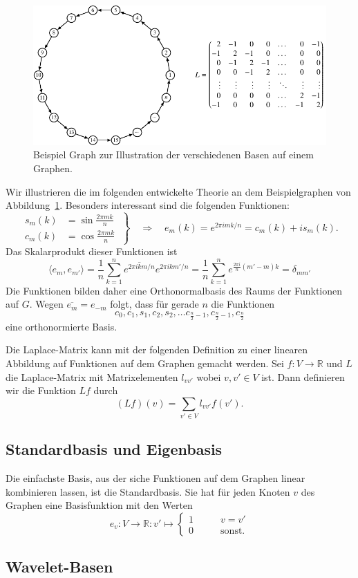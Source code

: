 \begin{figure}
\centering
\includegraphics{chapters/70-graphen/images/kreis.pdf}
\caption{Beispiel Graph zur Illustration der verschiedenen Basen auf einem
Graphen.
\label{buch:graphen:fig:kreis}}
\end{figure}
\begin{beispiel}
Wir illustrieren die im folgenden entwickelte Theorie an dem Beispielgraphen
von Abbildung~\ref{buch:graphen:fig:kreis}.
Besonders interessant sind die folgenden Funktionen:
\[
\left.
\begin{aligned}
s_m(k)
&=
\sin\frac{2\pi mk}{n}
\\
c_m(k)
&=
\cos\frac{2\pi mk}{n}
\end{aligned}
\;
\right\}
\quad
\Rightarrow
\quad
e_m(k)
=
e^{2\pi imk/n}
=
c_m(k) + is_m(k).
\]
Das Skalarprodukt dieser Funktionen ist
\[
\langle e_m, e_{m'}\rangle
=
\frac1n
\sum_{k=1}^n
\overline{e^{2\pi i km/n}}
e^{2\pi ikm'/n}
=
\frac1n
\sum_{k=1}^n
e^{\frac{2\pi i}{n}(m'-m)k}
=
\delta_{mm'}
\]
Die Funktionen bilden daher eine Orthonormalbasis des Raums der
Funktionen auf $G$.
Wegen $\overline{e_m} = e_{-m}$ folgt, dass für gerade $n$
die Funktionen
\[
c_0, c_1,s_1,c_2,s_2,\dots c_{\frac{n}2-1},c_{\frac{n}2-1},c_{\frac{n}2}
\]
eine orthonormierte Basis.
\end{beispiel}


Die Laplace-Matrix kann mit der folgenden Definition zu einer linearen
Abbildung auf Funktionen auf dem Graphen gemacht werden.
Sei $f\colon V\to \mathbb{R}$ und $L$ die Laplace-Matrix mit
Matrixelementen $l_{vv'}$ wobei $v,v'\in V$ ist.
Dann definieren wir die Funktion $Lf$ durch
\[
(Lf)(v)
=
\sum_{v'\in V} l_{vv'}f(v').
\]

\subsection{Standardbasis und Eigenbasis
\label{buch:subsection:standardbasis-und-eigenbasis}}
Die einfachste Basis, aus der siche Funktionen auf dem Graphen linear
kombinieren lassen, ist die Standardbasis.
Sie hat für jeden Knoten $v$ des Graphen eine Basisfunktion mit den Werten
\[
e_v\colon V\to\mathbb R:v'\mapsto \begin{cases}
1\qquad&v=v'\\
0\qquad&\text{sonst.}
\end{cases}
\]


\subsection{Wavelet-Basen
\label{buch:subsection:wavelet-basen}}






